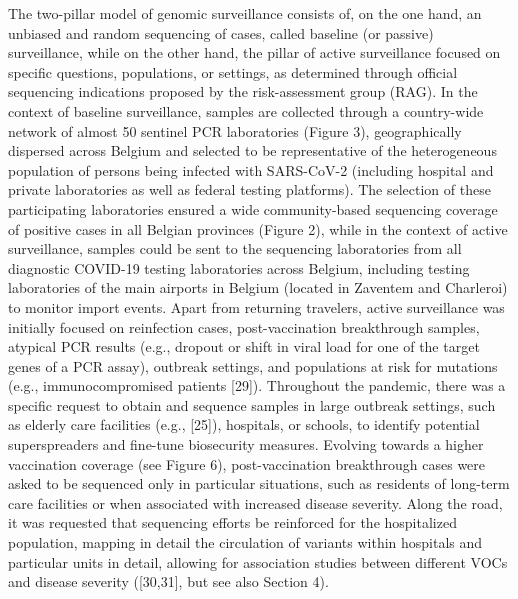 The two-pillar model of genomic surveillance consists of, on the one hand, an unbiased and random sequencing of cases, called baseline (or passive) surveillance, while on the other hand, the pillar of active surveillance focused on specific questions, populations, or settings, as determined through official sequencing indications proposed by the risk-assessment group (RAG). In the context of baseline surveillance, samples are collected through a country-wide network of almost 50 sentinel PCR laboratories (Figure 3), geographically dispersed across Belgium and selected to be representative of the heterogeneous population of persons being infected with SARS-CoV-2 (including hospital and private laboratories as well as federal testing platforms). The selection of these participating laboratories ensured a wide community-based sequencing coverage of positive cases in all Belgian provinces (Figure 2), while in the context of active surveillance, samples could be sent to the sequencing laboratories from all diagnostic COVID-19 testing laboratories across Belgium, including testing laboratories of the main airports in Belgium (located in Zaventem and Charleroi) to monitor import events. Apart from returning travelers, active surveillance was initially focused on reinfection cases, post-vaccination breakthrough samples, atypical PCR results (e.g., dropout or shift in viral load for one of the target genes of a PCR assay), outbreak settings, and populations at risk for mutations (e.g., immunocompromised patients [29]). Throughout the pandemic, there was a specific request to obtain and sequence samples in large outbreak settings, such as elderly care facilities (e.g., [25]), hospitals, or schools, to identify potential superspreaders and fine-tune biosecurity measures. Evolving towards a higher vaccination coverage (see Figure 6), post-vaccination breakthrough cases were asked to be sequenced only in particular situations, such as residents of long-term care facilities or when associated with increased disease severity. Along the road, it was requested that sequencing efforts be reinforced for the hospitalized population, mapping in detail the circulation of variants within hospitals and particular units in detail, allowing for association studies between different VOCs and disease severity ([30,31], but see also Section 4).

